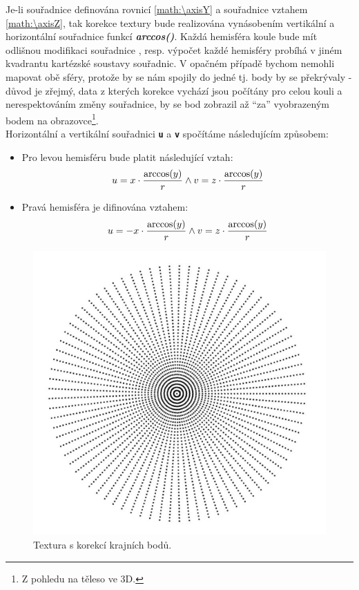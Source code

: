 Je-li  souřadnice \textit{\textbf{\axisY}} definována rovnicí \ref{math:\axisY} a souřadnice \textit{\textbf{\axisZ}} vztahem \ref{math:\axisZ}, tak korekce textury bude realizována vynásobením  vertikální a horizontální souřadnice funkcí \textit{\textbf{arccos(\axisY)}}. Každá hemisféra koule bude mít odlišnou modifikaci souřadnice \texttt{\textbf{\axisX{}}}, resp. výpočet každé hemisféry probíhá v jiném kvadrantu kartézské soustavy souřadnic. V opačném případě bychom nemohli mapovat obě sféry, protože by se nám spojily do jedné tj. body by se překrývaly - důvod je zřejmý, data z kterých korekce vychází jsou počítány pro celou kouli a nerespektováním změny souřadnice, by se bod zobrazil až  ``za'' vyobrazeným bodem na obrazovce\footnote{Z pohledu na těleso ve 3D.}. \\

Horizontální a vertikální souřadnici \texttt{\textbf{u}} a \texttt{\textbf{v}} spočítáme následujícím způsobem:




\begin{itemize}
	\item Pro levou hemisféru bude platit následující vztah:\\
		    $$u =  x{} \cdot \frac{\arccos(y{})}{r} \wedge v =  z{} \cdot \frac{\arccos(y{})}{r}$$   
		   
	\item Pravá hemisféra je difinována vztahem:\\
			$$u =  -x{} \cdot \frac{\arccos(y{})}{r}\wedge v =  z{} \cdot \frac{\arccos(y{})}{r} $$ 
 
\end{itemize}
 

\begin{figure}[h]
	\label{img:texture_with_correction}
	\centering
	\includegraphics[scale=1.0,angle=0,width=0.6\linewidth]{obrazky-figures/texture_correction}
	\caption{Textura s korekcí krajních bodů.}
\end{figure}

